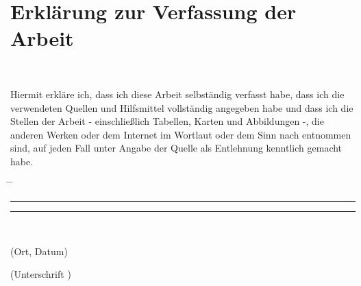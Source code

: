 \chapter*{Erklärung zur Verfassung der Arbeit}

\tuinfthesisauthor\\
\tuinfthesisauthoraddress

\vspace*{1.2cm}

Hiermit erkläre ich, dass ich diese Arbeit selbständig verfasst habe, 
dass ich die verwendeten Quellen und Hilfsmittel vollständig angegeben 
habe und dass ich die Stellen der Arbeit - einschließlich Tabellen, 
Karten und Abbildungen -, die anderen Werken oder dem Internet im 
Wortlaut oder dem Sinn nach entnommen sind, auf jeden Fall unter Angabe 
der Quelle als Entlehnung kenntlich gemacht habe.\\

\vspace*{2cm}
\begin{tabbing}%
    \hspace{58mm} \= \hspace{28mm} \= \hspace{58mm} \kill
    {\raggedright\rule{58mm}{0.5pt}} \> \> {\raggedright\rule{58mm}{0.5pt}} \\
    \begin{minipage}[t][0.5cm][t]{58mm}
	\vspace{0pt}\sffamily\thesistitlefontnormalsize
	\centering (Ort, Datum)
    \end{minipage}
    \> \>
    \begin{minipage}[t][0.5cm][t]{58mm}
	\vspace{0pt}\sffamily\thesistitlefontnormalsize
	\centering (Unterschrift \tuinfthesisverfassung)
    \end{minipage}
\end{tabbing}


